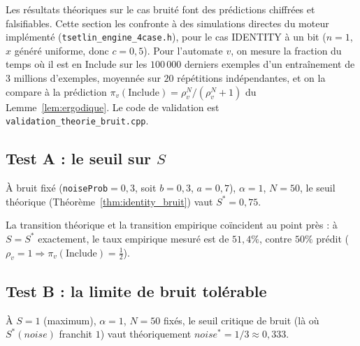 \documentclass[12pt,a4paper]{article}
\theoremstyle{remark}
\newcommand{\Inc}{\ensuremath{\mathrm{Include}}}
\begin{document}
Les résultats théoriques sur le cas bruité font des prédictions chiffrées et
falsifiables. Cette section les confronte à des simulations directes du moteur
implémenté (\texttt{tsetlin\_engine\_4case.h}), pour le cas IDENTITY à un bit ($n=1$,
$x$ généré uniforme, donc $c=0{,}5$). Pour l'automate $v$, on mesure la fraction du
temps où il est en \Inc{} sur les $100\,000$ derniers exemples d'un entraînement de
$3$ millions d'exemples, moyennée sur $20$ répétitions indépendantes, et on la compare
à la prédiction $\pi_v(\Inc)=\rho_v^N/(\rho_v^N+1)$ du Lemme~\ref{lem:ergodique}. Le
code de validation est \texttt{validation\_theorie\_bruit.cpp}.

\subsection{Test A : le seuil sur $S$}

À bruit fixé (\texttt{noiseProb}$=0{,}3$, soit $b=0{,}3$, $a=0{,}7$), $\alpha=1$,
$N=50$, le seuil théorique (Théorème~\ref{thm:identity_bruit}) vaut $S^*=0{,}75$.

\begin{center}
\end{center}

La transition théorique et la transition empirique coïncident au point près : à
$S=S^*$ exactement, le taux empirique mesuré est de $51{,}4\%$, contre $50\%$ prédit
($\rho_v=1 \Rightarrow \pi_v(\Inc)=\tfrac12$).

\subsection{Test B : la limite de bruit tolérable}

À $S=1$ (maximum), $\alpha=1$, $N=50$ fixés, le seuil critique de bruit (là où
$S^*(\mathit{noise})$ franchit $1$) vaut théoriquement $\mathit{noise}^* = 1/3 \approx 0{,}333$.
\end{document}

